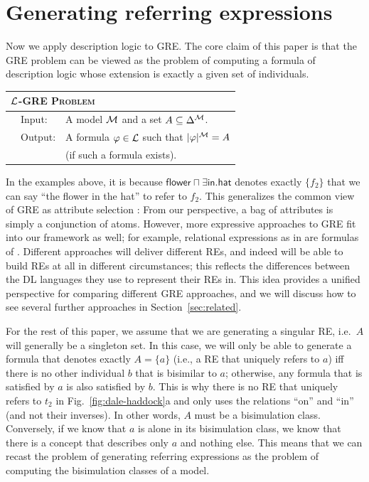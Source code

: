 \section{Generating referring expressions} \label{sec:gre}

Now we apply description logic to GRE.  The core claim of this paper
is that the GRE problem can be viewed as the problem of computing a
formula of description logic whose extension is exactly a given set of
individuals.

\medskip
\noindent
{\small
\begin{center}
\begin{tabular}{ll} \hline
\multicolumn{2}{l}{
\textsc{$\mathcal{L}$-GRE Problem}}\\ \hline
\ \ Input: & A model $\mathcal{M}$ and a set $A \subseteq \Delta^{\mathcal{M}}$.\\
\ \ Output: & A formula $\varphi \in \mathcal{L}$ such that $|\varphi|^{\mathcal{M}} = A$\\
& \hspace*{0.5cm} (if such a formula exists).\\ \hline
\end{tabular}
\end{center}}
\medskip

In the examples above, it is because $\mathsf{flower} \sqcap \exists
\mathsf{in}. \mathsf{hat}$ denotes exactly $\{f_2\}$ that we can say
``the flower in the hat'' to refer to $f_2$.  This generalizes the
common view of GRE as attribute selection \cite{Dale1995}: From our
perspective, a bag of attributes is simply a conjunction of atoms.
However, more expressive approaches to GRE fit into our framework as
well; for example, relational expressions as in
 are formulas of \el.
Different approaches will deliver different REs, and indeed will be
able to build REs at all in different circumstances; this reflects the
differences between the DL languages they use to represent their REs
in.  This idea provides a unified perspective for comparing different
GRE approaches, and we will discuss how to see several further
approaches in Section~\ref{sec:related}.

For the rest of this paper, we assume that we are generating a
singular RE, i.e.\ $A$ will generally be a singleton set.  In this
case, we will only be able to generate a formula that denotes exactly
$A = \{a\}$ (i.e., a RE that uniquely refers to $a$) iff there is no
other individual $b$ that is bisimilar to $a$; otherwise, any formula
that is satisfied by $a$ is also satisfied by $b$.  This is why there
is no RE that uniquely refers to $t_2$ in Fig.~\ref{fig:dale-haddock}a
and only uses the relations ``on'' and ``in'' (and not their
inverses).  In other words, $A$ must be a bisimulation class.
Conversely, if we know that $a$ is alone in its bisimulation class, we
know that there is a concept that describes only $a$ and nothing
else.  This means that we can recast the problem of generating
referring expressions as the problem of computing the bisimulation
classes of a model.

